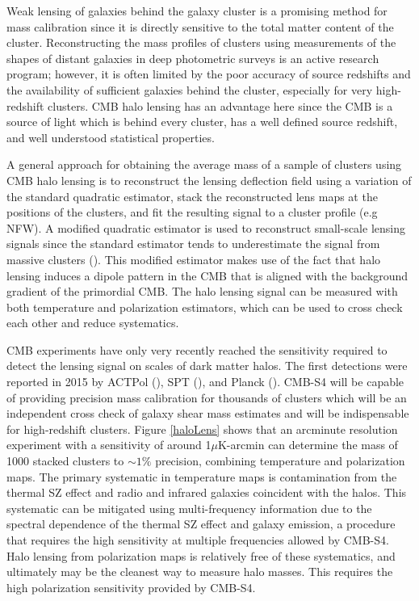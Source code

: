 Weak lensing of galaxies behind the galaxy cluster is a promising method for mass calibration since it is directly sensitive to the total matter content of the cluster.  Reconstructing the mass profiles of clusters using measurements of the shapes of distant galaxies in deep photometric surveys is an active research program; however, it is often limited by the poor accuracy of source redshifts and the availability of sufficient galaxies behind the cluster, especially for very high-redshift clusters. CMB halo lensing has an advantage here since the CMB is a source of light which is behind every cluster, has a well defined source redshift, and well understood statistical properties.  

A general approach for obtaining the average mass of a sample of clusters using CMB halo lensing is to reconstruct the lensing deflection field using a variation of the standard quadratic estimator, stack the reconstructed lens maps at the positions of the clusters, and fit the resulting signal to a cluster profile (e.g NFW). A modified quadratic estimator is used to reconstruct small-scale lensing signals since the standard estimator tends to underestimate the signal from massive clusters (\cite{Hu:2007bt}).  This modified estimator makes use of the fact that halo lensing induces a dipole pattern in the CMB that is aligned with the background gradient of the primordial CMB.  The halo lensing signal can be measured with both temperature and polarization estimators, which can be used to cross check each other and reduce systematics. 

CMB experiments have only very recently reached the sensitivity required to detect the lensing signal on scales of dark matter halos.  The first detections were reported in 2015 by ACTPol (\cite{Madhavacheril:2014slf}), SPT (\cite{Baxter:2014frs}), and Planck (\cite{Ade:2015fva}).  CMB-S4 will be capable of providing precision mass calibration for thousands of clusters which will be an independent cross check of galaxy shear mass estimates and will be indispensable for high-redshift clusters. Figure \ref{haloLens} shows that an arcminute resolution experiment with a sensitivity of around 1$\mu$K-arcmin can determine the mass of 1000 stacked clusters to $\sim 1\%$ precision, combining temperature and polarization maps. The primary systematic in temperature maps is contamination from the thermal SZ effect and radio and infrared galaxies coincident with the halos. This systematic can be mitigated using multi-frequency information due to the spectral dependence of the thermal SZ effect and galaxy emission, a procedure that requires the high sensitivity at multiple frequencies allowed by CMB-S4.  Halo lensing from polarization maps is relatively free of these systematics, and ultimately may be the cleanest way to measure halo masses.  This requires the high polarization sensitivity provided by CMB-S4. 


